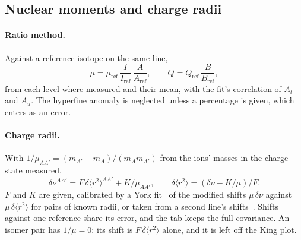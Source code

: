 \subsection{Nuclear moments and charge radii}

\paragraph{Ratio method.} Against a reference isotope on the same line,
\begin{equation}
    \mu = \mu_\mathrm{ref}\,\frac{I}{I_\mathrm{ref}}\,\frac{A}{A_\mathrm{ref}},
    \qquad
    Q = Q_\mathrm{ref}\,\frac{B}{B_\mathrm{ref}},
\end{equation}
from each level where measured and their mean, with the fit's
correlation of $A_l$ and $A_u$. The hyperfine anomaly is neglected
unless a percentage is given, which enters as an error.

\paragraph{Charge radii.} With
$1/\mu_{AA'} = (m_{A'}-m_A)/(m_A m_{A'})$ from the ions' masses in the
charge state measured,
\begin{equation}
    \delta\nu^{AA'} = F\,\delta\langle r^2\rangle^{AA'} + K/\mu_{AA'},
    \qquad
    \delta\langle r^2\rangle = (\delta\nu - K/\mu)/F .
\end{equation}
$F$ and $K$ are given, calibrated by a York fit~\cite{york2004} of the
modified shifts $\mu\,\delta\nu$ against $\mu\,\delta\langle r^2\rangle$
for pairs of known radii, or taken from a second line's
shifts~\cite{king1984}. Shifts against one reference share its error,
and the tab keeps the full covariance. An isomer pair has $1/\mu = 0$:
its shift is $F\,\delta\langle r^2\rangle$ alone, and it is left off the
King plot.
